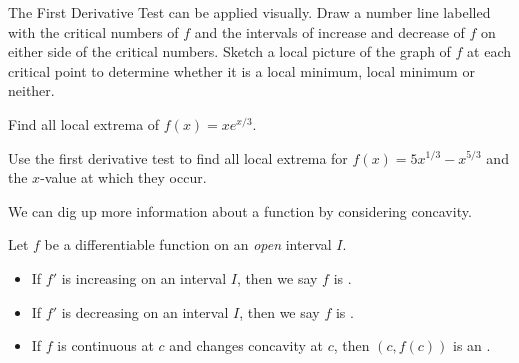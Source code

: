 \documentclass[../main.tex]{subfiles}
\begin{document}
\faStar{} The First Derivative Test can be applied visually. Draw a number line labelled with the critical numbers of \(f\) and the intervals of increase and decrease of \(f\) on either side of the critical numbers. Sketch a local picture of the graph of \(f\) at each critical point to determine whether it is a local minimum, local minimum or neither.

\begin{example} \label{eg:shape-2}
  Find all local extrema of \(f(x) = x e^{x/3}\).

  \blanks*
\end{example}
\clearpage

\begin{exercise} \label{ex:first-derivative}
  Use the first derivative test to find all local extrema for \(f(x) = 5x^{1/3} - x^{5/3}\) and the \(x\)-value at which they occur. 

  \blanks*
\end{exercise}
\clearpage

We can dig up more information about a function by considering concavity.
\begin{definition}
  Let \(f\) be a differentiable function on an \emph{open} interval \(I\).
  \begin{itemize}
    \item If \(f'\) is increasing on an interval \(I\), then we say \(f\) is .
    \item If \(f'\) is decreasing on an interval \(I\), then we say \(f\) is .
    \item If \(f\) is continuous at \(c\) and changes concavity at \(c\), then \((c,f(c))\) is an .
  \end{itemize}

\end{definition}

\begin{center}
  
  \hfill
  
  \hfill
  

\end{center}
\end{document}
